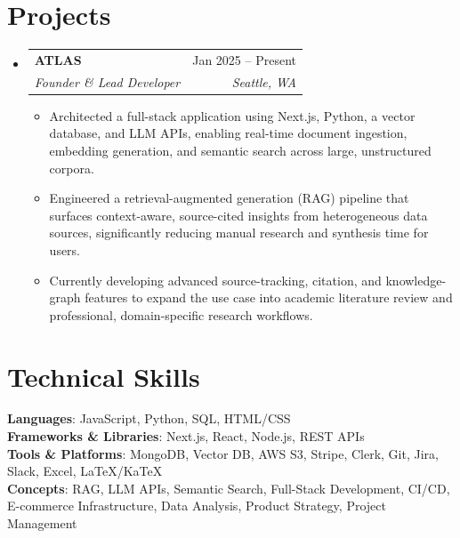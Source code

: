 \documentclass[letterpaper,11pt]{article}
\makeatletter
\newcommand{\resumeItem}[1]{\item\small{#1 \vspace{-2pt}}}
\newcommand{\resumeSubheading}[4]{\vspace{-2pt}\item\begin{tabular*}{0.97\textwidth}[t]{l@{\extracolsep{\fill}}r}\textbf{#1} & #2 \\\textit{\small#3} & \textit{\small #4} \\\end{tabular*}\vspace{-7pt}}
\newcommand{\resumeSubHeadingListStart}{\begin{itemize}[leftmargin=0.15in, label={}]}
\newcommand{\resumeSubHeadingListEnd}{\end{itemize}}
\newcommand{\resumeItemListStart}{\begin{itemize}}
\newcommand{\resumeItemListEnd}{\end{itemize}\vspace{-5pt}}
\makeatother
\begin{document}
\section{Projects}
  \resumeSubHeadingListStart
    \resumeSubheading
      {ATLAS}{Jan 2025 -- Present}
      {Founder \& Lead Developer}{Seattle, WA}
      \resumeItemListStart
        \resumeItem{Architected a full-stack application using Next.js, Python, a vector database, and LLM APIs, enabling real-time document ingestion, embedding generation, and semantic search across large, unstructured corpora.}
        \resumeItem{Engineered a retrieval-augmented generation (RAG) pipeline that surfaces context-aware, source-cited insights from heterogeneous data sources, significantly reducing manual research and synthesis time for users.}
        \resumeItem{Currently developing advanced source-tracking, citation, and knowledge-graph features to expand the use case into academic literature review and professional, domain-specific research workflows.}
      \resumeItemListEnd
  \resumeSubHeadingListEnd

\section{Technical Skills}
 \begin{itemize}[leftmargin=0.15in, label={}]
    \small{\item{
     \textbf{Languages}{: JavaScript, Python, SQL, HTML/CSS} \\
     \textbf{Frameworks \& Libraries}{: Next.js, React, Node.js, REST APIs} \\
     \textbf{Tools \& Platforms}{: MongoDB, Vector DB, AWS S3, Stripe, Clerk, Git, Jira, Slack, Excel, LaTeX/KaTeX} \\
     \textbf{Concepts}{: RAG, LLM APIs, Semantic Search, Full-Stack Development, CI/CD, E-commerce Infrastructure, Data Analysis, Product Strategy, Project Management}
    }}
 \end{itemize}
\end{document}

